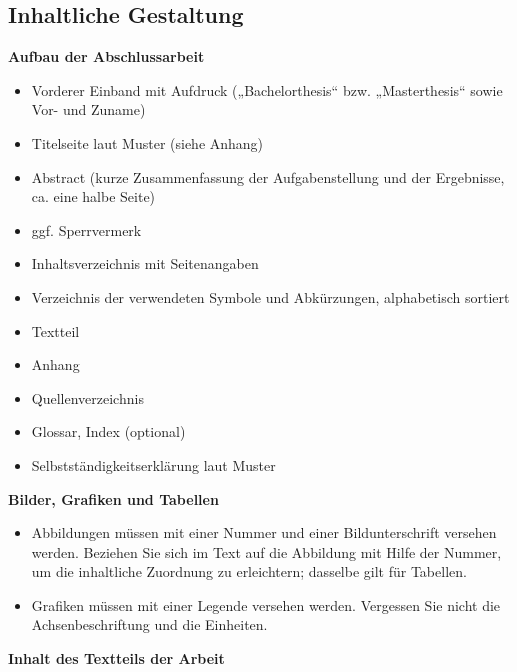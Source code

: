 \subsection{Inhaltliche Gestaltung }

\textbf{Aufbau der Abschlussarbeit}
\begin{itemize}
\item Vorderer Einband mit Aufdruck („Bachelorthesis“ bzw. „Masterthesis“ sowie Vor- und Zuname)
\item Titelseite laut Muster (siehe Anhang)
\item Abstract (kurze Zusammenfassung der Aufgabenstellung und der Ergebnisse, ca. eine halbe Seite)
\item ggf. Sperrvermerk
\item Inhaltsverzeichnis mit Seitenangaben 
\item Verzeichnis der verwendeten Symbole und Abkürzungen, alphabetisch sortiert
\item Textteil 
\item Anhang
\item Quellenverzeichnis
\item Glossar, Index (optional)
\item Selbstständigkeitserklärung laut Muster
\end{itemize}

\textbf{Bilder, Grafiken und Tabellen}

\begin{itemize}
\item Abbildungen müssen mit einer Nummer und einer Bildunterschrift versehen werden. Beziehen Sie sich im Text auf die Abbildung mit Hilfe der Nummer, um die inhaltliche Zuordnung zu erleichtern; dasselbe gilt für Tabellen.
\item Grafiken müssen mit einer Legende versehen werden. Vergessen Sie nicht die Achsenbeschriftung und die Einheiten.
\end{itemize}

\textbf{Inhalt des Textteils der Arbeit}

